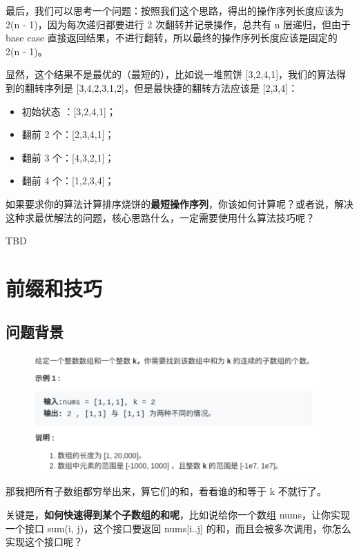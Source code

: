\documentclass[12pt]{article}
\begin{document}
最后，我们可以思考一个问题​：按照我们这个思路，得出的操作序列长度应该为​ 2(n - 1)，因为每次递归都要进行 2 次翻转并记录操作，总共有 n 层递归，但由于 base case 直接返回结果，不进行翻转，所以最终的操作序列长度应该是固定的 2(n - 1)。

显然，这个结果不是最优的（最短的），比如说一堆煎饼 [3,2,4,1]，我们的算法得到的翻转序列是 [3,4,2,3,1,2]，但是最快捷的翻转方法应该是 [2,3,4]：
\begin{itemize}
\setlength{\itemsep}{0pt}
\setlength{\parsep}{0pt}
\setlength{\parskip}{0pt}
    \item 初始状态 ：[3,2,4,1]；
    \item 翻前 2 个：[2,3,4,1]；
    \item 翻前 3 个：[4,3,2,1]；
    \item 翻前 4 个：[1,2,3,4]；
\end{itemize}

如果要求你的算法计算排序烧饼的\textbf{最短操作序列}，你该如何计算呢？或者说，解决这种求最优解法的问题，核心思路什么，一定需要使用什么算法技巧呢？

TBD

\section{前缀和技巧}
\subsection{问题背景}
\begin{figure}[H]
    \centering
    \includegraphics[width=1\textwidth]{fig/Prefix_Tricks_1.png}
\end{figure}

那我把所有子数组都穷举出来，算它们的和，看看谁的和等于 k 不就行了。

关键是，\textbf{如何快速得到某个子数组的和呢}，比如说给你一个数组 nums，让你实现一个接口 sum(i, j)，这个接口要返回 nums[i..j] 的和，而且会被多次调用，你怎么实现这个接口呢？
\end{document}
